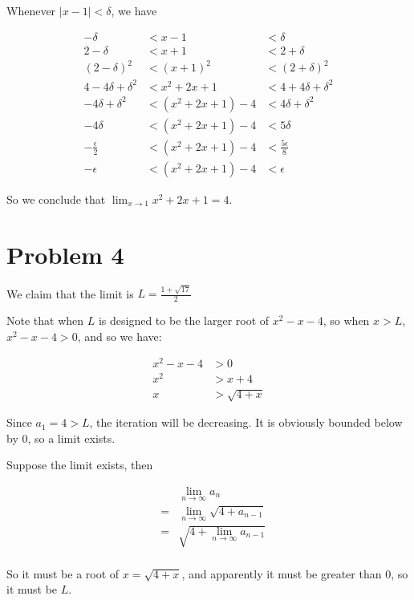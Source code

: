\documentclass{article}
\begin{document}
Whenever $ | x - 1 | < \delta $, we have

\begin{eqnarray*}
    -\delta &< x - 1 &< \delta \\
    2 -\delta &< x + 1 &< 2 + \delta \\
    (2 -\delta)^2 &< (x + 1)^2 &< (2 + \delta)^2 \\
    4 - 4\delta + \delta^2 &< x^2 + 2x + 1 &< 4 + 4\delta + \delta^2 \\
    -4\delta + \delta^2 &< (x^2 + 2x + 1) - 4 &< 4\delta + \delta^2 \\
    -4\delta &< (x^2 + 2x + 1) - 4 &< 5\delta \\
    -\frac{\epsilon}{2} &< (x^2 + 2x + 1) - 4 &< \frac{5\epsilon}{8} \\
    -\epsilon &< (x^2 + 2x + 1) - 4 &< \epsilon
\end{eqnarray*}

So we conclude that $ \lim_{x \to 1} x^2 + 2x + 1 = 4 $.

\section*{Problem 4}

We claim that the limit is $ L = \frac{1 + \sqrt{17}}{2} $

Note that when $ L $ is designed to be the larger root of $ x^2 - x - 4 $, so when $ x > L $, $ x^2 - x - 4 > 0 $, and so we have:

\begin{eqnarray*}
  x^2 - x - 4 &> 0 \\
  x^2 &> x + 4 \\
  x &> \sqrt{4 + x}
\end{eqnarray*}

Since $ a_1 = 4 > L $, the iteration will be decreasing. It is obviously bounded below by 0, so a limit exists.

Suppose the limit exists, then 

\begin{eqnarray*}
  & & \lim_{n \to \infty} a_n \\
  &=& \lim_{n \to \infty} \sqrt{4 + a_{n-1}} \\
  &=& \sqrt{4 + \lim_{n \to \infty} a_{n-1}} \\
\end{eqnarray*}

So it must be a root of $ x = \sqrt{4 + x} $, and apparently it must be greater than 0, so it must be $ L $.
\end{document}
